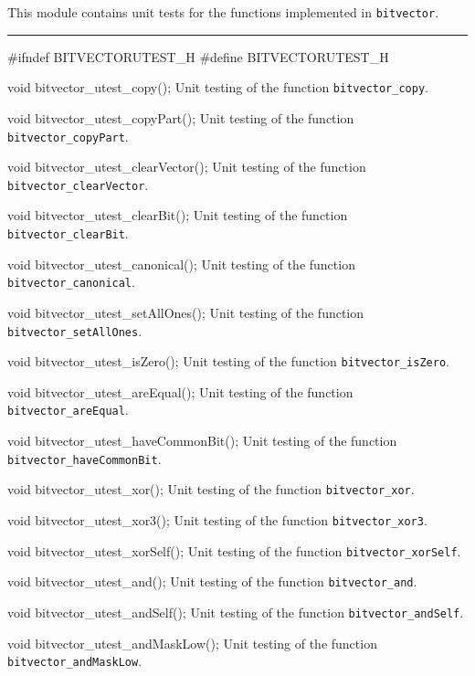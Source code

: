 
This module contains unit tests for the functions implemented in {\tt bitvector}. 

\bigskip
\hrule
\code
\hide
#ifndef BITVECTORUTEST_H
#define BITVECTORUTEST_H
\endhide
\endcode

\code
void bitvector_utest_copy();
\endcode
 \tab  Unit testing of the function {\tt bitvector\_copy}.
 \endtab
\code

void bitvector_utest_copyPart();
\endcode
 \tab  Unit testing of the function {\tt bitvector\_copyPart}.
 \endtab
\code

void bitvector_utest_clearVector();
\endcode
 \tab  Unit testing of the function {\tt bitvector\_clearVector}.
 \endtab
\code

void bitvector_utest_clearBit();
\endcode
 \tab  Unit testing of the function {\tt bitvector\_clearBit}.
 \endtab
\code

void bitvector_utest_canonical();
\endcode
 \tab  Unit testing of the function {\tt bitvector\_canonical}.
 \endtab
\code

void bitvector_utest_setAllOnes();
\endcode
 \tab  Unit testing of the function {\tt bitvector\_setAllOnes}.
 \endtab
\code

void bitvector_utest_isZero();
\endcode
 \tab  Unit testing of the function {\tt bitvector\_isZero}.
 \endtab
\code

void bitvector_utest_areEqual();
\endcode
 \tab  Unit testing of the function {\tt bitvector\_areEqual}.
 \endtab
\code

void bitvector_utest_haveCommonBit();
\endcode
 \tab  Unit testing of the function {\tt bitvector\_haveCommonBit}.
 \endtab
\code

void bitvector_utest_xor();
\endcode
 \tab  Unit testing of the function {\tt bitvector\_xor}.
 \endtab
\code

void bitvector_utest_xor3();
\endcode
 \tab  Unit testing of the function {\tt bitvector\_xor3}.
 \endtab
\code

void bitvector_utest_xorSelf();
\endcode
 \tab  Unit testing of the function {\tt bitvector\_xorSelf}.
 \endtab
\code

void bitvector_utest_and();
\endcode
 \tab  Unit testing of the function {\tt bitvector\_and}.
 \endtab
\code

void bitvector_utest_andSelf();
\endcode
 \tab  Unit testing of the function {\tt bitvector\_andSelf}.
 \endtab
\code

void bitvector_utest_andMaskLow();
\endcode
 \tab  Unit testing of the function {\tt bitvector\_andMaskLow}.
 \endtab
\code

